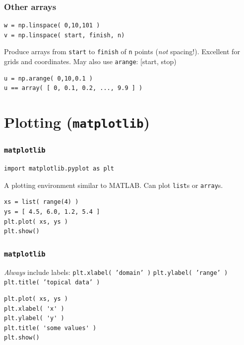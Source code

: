 \documentclass[11pt]{beamer}
\begin{document}
\begin{frame}[fragile]
  \frametitle{Other arrays}
  \Enlarge

  \begin{Verbatim}
w = np.linspace( 0,10,101 )
v = np.linspace( start, finish, n)
  \end{Verbatim}
  \begin{enumerate}
  \myitem  Produce arrays from \texttt{start} to \texttt{finish} of \texttt{n} points (\emph{not} spacing!).
  \myitem  Excellent for grids and coordinates.
  \myitem  May also use \texttt{arange}: [start, stop) %
  \end{enumerate}
  \begin{Verbatim}
u = np.arange( 0,10,0.1 )  
u == array( [ 0, 0.1, 0.2, ..., 9.9 ] )
  \end{Verbatim}
\end{frame}


\section{Plotting (\texttt{matplotlib})}

\begin{frame}[fragile]
  \frametitle{\texttt{matplotlib}}
  \Enlarge

  \begin{Verbatim}
import matplotlib.pyplot as plt
  \end{Verbatim}
  \begin{enumerate}
  \myitem  A plotting environment similar to MATLAB.
  \myitem  Can plot \texttt{list}s or \texttt{array}s.
  \end{enumerate}
  \begin{Verbatim}
xs = list( range(4) )
ys = [ 4.5, 6.0, 1.2, 5.4 ]
plt.plot( xs, ys )
plt.show()
  \end{Verbatim}
\end{frame}

\begin{frame}[fragile]
  \frametitle{\texttt{matplotlib}}
  \Enlarge

  \begin{enumerate}
  \myitem  \emph{Always} include labels:
  	\mysubitem  \texttt{plt.xlabel( 'domain' )}
  	\mysubitem  \texttt{plt.ylabel( 'range' )}
  	\mysubitem  \texttt{plt.title( 'topical data' )}
  \end{enumerate}
  \begin{Verbatim}
plt.plot( xs, ys )
plt.xlabel( 'x' )
plt.ylabel( 'y' )
plt.title( 'some values' )
plt.show()
  \end{Verbatim}
\end{frame}
\end{document}
